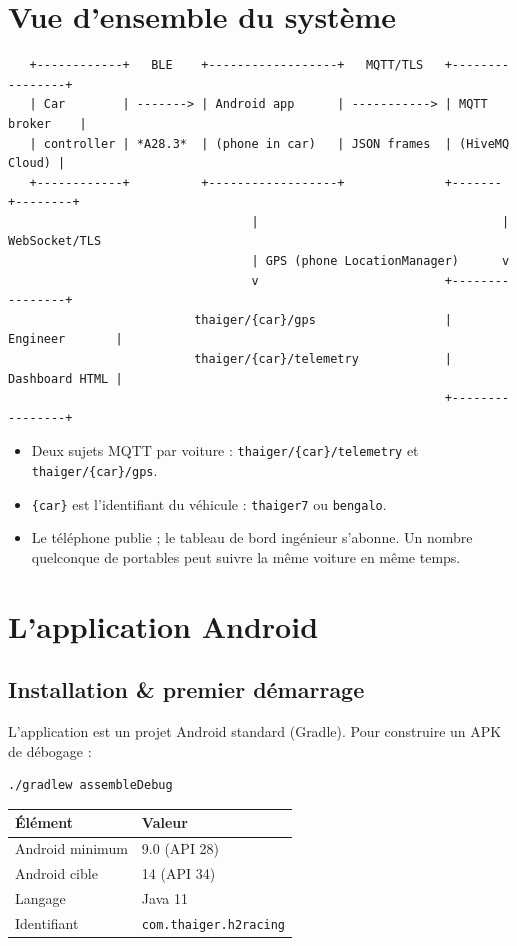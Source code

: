 \documentclass[11pt,a4paper,oneside]{report}
\newcommand{\code}[1]{\texttt{#1}}
\begin{document}
\section{Vue d'ensemble du système}

\begin{lstlisting}
   +------------+   BLE    +------------------+   MQTT/TLS   +----------------+
   | Car        | -------> | Android app      | -----------> | MQTT broker    |
   | controller | *A28.3*  | (phone in car)   | JSON frames  | (HiveMQ Cloud) |
   +------------+          +------------------+              +-------+--------+
                                  |                                  | WebSocket/TLS
                                  | GPS (phone LocationManager)      v
                                  v                          +----------------+
                          thaiger/{car}/gps                  | Engineer       |
                          thaiger/{car}/telemetry            | Dashboard HTML |
                                                             +----------------+
\end{lstlisting}
\begin{itemize}
  \item Deux sujets MQTT par voiture : \code{thaiger/\{car\}/telemetry} et
    \code{thaiger/\{car\}/gps}.
  \item \code{\{car\}} est l'identifiant du véhicule : \code{thaiger7} ou
    \code{bengalo}.
  \item Le téléphone publie ; le tableau de bord ingénieur s'abonne. Un nombre
    quelconque de portables peut suivre la même voiture en même temps.
\end{itemize}

\section{L'application Android}

\subsection{Installation \& premier démarrage}
L'application est un projet Android standard (Gradle). Pour construire un APK de
débogage :

\begin{lstlisting}
./gradlew assembleDebug
\end{lstlisting}

\begin{tabularx}{\linewidth}{@{}lL@{}}
\toprule
\textbf{Élément} & \textbf{Valeur}\\
\midrule
Android minimum & 9.0 (API 28)\\
Android cible & 14 (API 34)\\
Langage & Java 11\\
Identifiant & \code{com.thaiger.h2racing}\\
\bottomrule
\end{tabularx}
\end{document}
